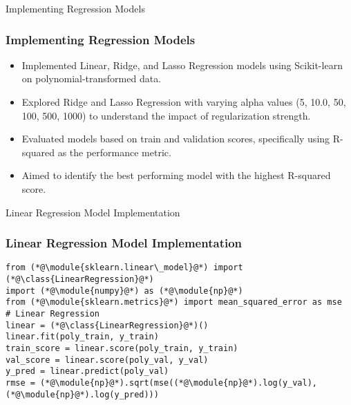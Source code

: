 \begin{frame}{Implementing Regression Models}
    \frametitle{Implementing Regression Models}
    \begin{itemize}
        \item Implemented Linear, Ridge, and Lasso Regression models using Scikit-learn on polynomial-transformed data.
        \item Explored Ridge and Lasso Regression with varying alpha values (5, 10.0, 50, 100, 500, 1000) to understand the impact of regularization strength.
        \item Evaluated models based on train and validation scores, specifically using R-squared as the performance metric.
        \item Aimed to identify the best performing model with the highest R-squared score.
    \end{itemize}
\end{frame}

\begin{frame}[fragile]{Linear Regression Model Implementation}
    \frametitle{Linear Regression Model Implementation}
    \begin{lstlisting}[caption={Implementing Linear Regression using sklearn.linear\_model.}, label=lst:linear_regression_implementation]
from (*@\module{sklearn.linear\_model}@*) import (*@\class{LinearRegression}@*)
import (*@\module{numpy}@*) as (*@\module{np}@*)
from (*@\module{sklearn.metrics}@*) import mean_squared_error as mse
# Linear Regression
linear = (*@\class{LinearRegression}@*)()
linear.fit(poly_train, y_train)
train_score = linear.score(poly_train, y_train)
val_score = linear.score(poly_val, y_val)
y_pred = linear.predict(poly_val)
rmse = (*@\module{np}@*).sqrt(mse((*@\module{np}@*).log(y_val), (*@\module{np}@*).log(y_pred)))
    \end{lstlisting}
\end{frame}


        



